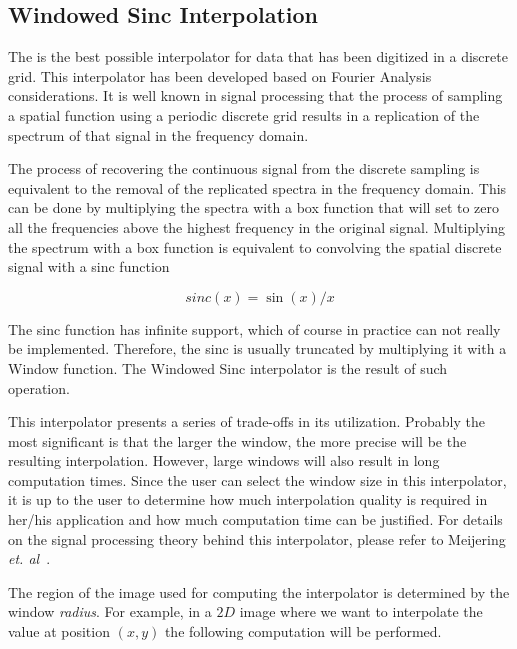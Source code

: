 \subsection{Windowed Sinc Interpolation}
\label{sec:WindowedSincInterpolation}

The  is the best possible
interpolator for data that has been digitized in a discrete grid. This
interpolator has been developed based on Fourier Analysis considerations. It
is well known in signal processing that the process of sampling a spatial
function using a periodic discrete grid results in a replication of the
spectrum of that signal in the frequency domain.

The process of recovering the continuous signal from the discrete sampling is
equivalent to the removal of the replicated spectra in the frequency domain.
This can be done by multiplying the spectra with a box function that will set
to zero all the frequencies above the highest frequency in the original signal.
Multiplying the spectrum with a box function is equivalent to convolving the
spatial discrete signal with a sinc function

\begin{equation}
sinc(x) = \sin{(x)} / x
\end{equation}

The sinc function has infinite support, which of course in practice can not
really be implemented. Therefore, the sinc is usually truncated by multiplying
it with a Window function. The Windowed Sinc interpolator is the result of such
operation.

This interpolator presents a series of trade-offs in its utilization. Probably
the most significant is that the larger the window, the more precise will be
the resulting interpolation. However, large windows will also result in long
computation times. Since the user can select the window size in this
interpolator, it is up to the user to determine how much interpolation quality
is required in her/his application and how much computation time can be
justified. For details on the signal processing theory behind this
interpolator, please refer to Meijering \emph{et.
al}~\cite{SignalReconstruction}.

The region of the image used for computing the interpolator is determined by
the window \emph{radius}. For example, in a $2D$ image where we want to
interpolate the value at position $(x,y)$ the following computation will be
performed.

